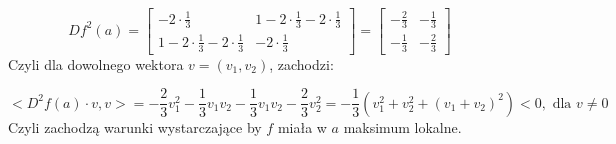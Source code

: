\documentclass{article}
\begin{document}
$$Df^2(a) = 
\begin{bmatrix}
	-2\cdot\frac{1}{3} & 1 -2\cdot\frac{1}{3} -2\cdot\frac{1}{3} \\
	1-2\cdot\frac{1}{3}-2\cdot\frac{1}{3} & -2\cdot\frac{1}{3}
\end{bmatrix} =
\begin{bmatrix}
	-\frac{2}{3} & -\frac{1}{3} \\
	-\frac{1}{3} & -\frac{2}{3}
\end{bmatrix}
$$
Czyli dla dowolnego wektora $v = (v_1,v_2)$, zachodzi:

$$<D^2f(a)\cdot v, v> = -\frac{2}{3}v_1^2 - \frac{1}{3}v_1v_2 - \frac{1}{3}v_1v_2 - \frac{2}{3}v_2^2 = -\frac{1}{3}(v_1^2 + v_2^2 + (v_1+v_2)^2) < 0, \mbox{ dla } v \neq 0$$
Czyli zachodzą warunki wystarczające by $f$ miała w $a$ maksimum lokalne.
\end{document}
